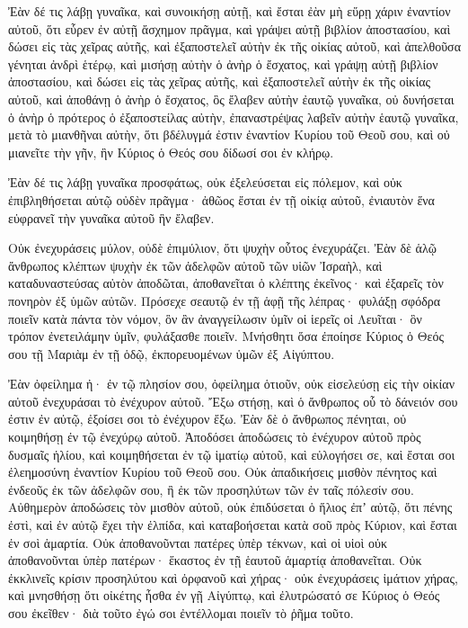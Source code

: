 {Ἐὰν δέ τις λάβῃ γυναῖκα, καὶ συνοικήσῃ αὐτῇ, καὶ ἔσται ἐὰν μὴ εὕρῃ χάριν ἐναντίον αὐτοῦ, ὅτι εὗρεν ἐν αὐτῇ ἄσχημον πρᾶγμα, καὶ γράψει αὐτῇ βιβλίον ἀποστασίου, καὶ δώσει εἰς τὰς χεῖρας αὐτῆς, καὶ ἐξαποστελεῖ αὐτὴν ἐκ τῆς οἰκίας αὐτοῦ,
καὶ ἀπελθοῦσα γένηται ἀνδρὶ ἑτέρῳ,
καὶ μισήσῃ αὐτὴν ὁ ἀνὴρ ὁ ἔσχατος, καὶ γράψῃ αὐτῇ βιβλίον ἀποστασίου, καὶ δώσει εἰς τὰς χεῖρας αὐτῆς, καὶ ἐξαποστελεῖ αὐτὴν ἐκ τῆς οἰκίας αὐτοῦ, καὶ ἀποθάνῃ ὁ ἀνὴρ ὁ ἔσχατος, ὃς ἔλαβεν αὐτὴν ἐαυτῷ γυναῖκα,
οὐ δυνήσεται ὁ ἀνὴρ ὁ πρότερος ὁ ἐξαποστείλας αὐτὴν, ἐπαναστρέψας λαβεῖν αὐτὴν ἑαυτῷ γυναῖκα, μετὰ τὸ μιανθῆναι αὐτὴν, ὅτι βδέλυγμά ἐστιν ἐναντίον Κυρίου τοῦ Θεοῦ σου, καὶ οὐ μιανεῖτε τὴν γῆν, ἣν Κύριος ὁ Θεός σου δίδωσί σοι ἐν κλήρῳ.
\par }{\PP {}Ἐὰν δέ τις λάβῃ γυναῖκα προσφάτως, οὐκ ἐξελεύσεται εἰς πόλεμον, καὶ οὐκ ἐπιβληθήσεται αὐτῷ οὐδὲν πρᾶγμα· ἀθῶος ἔσται ἐν τῇ οἰκίᾳ αὐτοῦ, ἐνιαυτὸν ἕνα εὐφρανεῖ τὴν γυναῖκα αὐτοῦ ἣν ἔλαβεν.
\par }{\PP {}Οὐκ ἐνεχυράσεις μύλον, οὐδὲ ἐπιμύλιον, ὅτι ψυχὴν οὗτος ἐνεχυράζει.
Ἐὰν δὲ ἁλῷ ἄνθρωπος κλέπτων ψυχὴν ἐκ τῶν ἀδελφῶν αὐτοῦ τῶν υἱῶν Ἰσραὴλ, καὶ καταδυναστεύσας αὐτὸν ἀποδῶται, ἀποθανεῖται ὁ κλέπτης ἐκεῖνος· καὶ ἐξαρεῖς τὸν πονηρὸν ἐξ ὑμῶν αὐτῶν.
Πρόσεχε σεαυτῷ ἐν τῇ ἁφῇ τῆς λέπρας· φυλάξῃ σφόδρα ποιεῖν κατὰ πάντα τὸν νόμον, ὃν ἂν ἀναγγείλωσιν ὑμῖν οἱ ἱερεῖς οἱ Λευῖται· ὃν τρόπον ἐνετειλάμην ὑμῖν, φυλάξασθε ποιεῖν.
Μνήσθητι ὅσα ἐποίησε Κύριος ὁ Θεός σου τῇ Μαριὰμ ἐν τῇ ὁδῷ, ἐκπορευομένων ὑμῶν ἐξ Αἰγύπτου.
\par }{\PP {}Ἐὰν ὀφείλημα ἠ· ἐν τῷ πλησίον σου, ὀφείλημα ὁτιοῦν, οὐκ εἰσελεύσῃ εἰς τὴν οἰκίαν αὐτοῦ ἐνεχυράσαι τὸ ἐνέχυρον αὐτοῦ.
Ἔξω στήσῃ, καὶ ὁ ἄνθρωπος οὗ τὸ δάνειόν σου ἐστιν ἐν αὐτῷ, ἐξοίσει σοι τὸ ἐνέχυρον ἔξω.
Ἐὰν δὲ ὁ ἄνθρωπος πένηται, οὐ κοιμηθήσῃ ἐν τῷ ἐνεχύρῳ αὐτοῦ.
Ἀποδόσει ἀποδώσεις τὸ ἐνέχυρον αὐτοῦ πρὸς δυσμαῖς ἡλίου, καὶ κοιμηθήσεται ἐν τῷ ἱματίῳ αὐτοῦ, καὶ εὐλογήσει σε, καὶ ἔσται σοι ἐλεημοσύνη ἐναντίον Κυρίου τοῦ Θεοῦ σου.
Οὐκ ἀπαδικήσεις μισθὸν πένητος καὶ ἐνδεοῦς ἐκ τῶν ἀδελφῶν σου, ἢ ἐκ τῶν προσηλύτων τῶν ἐν ταῖς πόλεσίν σου.
Αὐθημερὸν ἀποδώσεις τὸν μισθὸν αὐτοῦ, οὐκ ἐπιδύσεται ὁ ἥλιος ἐπʼ αὐτῷ, ὅτι πένης ἐστὶ, καὶ ἐν αὐτῷ ἔχει τὴν ἐλπίδα, καὶ καταβοήσεται κατὰ σοῦ πρὸς Κύριον, καὶ ἔσται ἐν σοὶ ἁμαρτία.
Οὐκ ἀποθανοῦνται πατέρες ὑπὲρ τέκνων, καὶ οἱ υἱοὶ οὐκ ἀποθανοῦνται ὑπὲρ πατέρων· ἕκαστος ἐν τῇ ἑαυτοῦ ἁμαρτίᾳ ἀποθανεῖται.
Οὐκ ἐκκλινεῖς κρίσιν προσηλύτου καὶ ὀρφανοῦ καὶ χήρας·
οὐκ ἐνεχυράσεις ἱμάτιον χήρας, καὶ μνησθήσῃ ὅτι οἰκέτης ἦσθα ἐν γῇ Αἰγύπτῳ, καὶ ἐλυτρώσατό σε Κύριος ὁ Θεός σου ἐκεῖθεν· διὰ τοῦτο ἐγώ σοι ἐντέλλομαι ποιεῖν τὸ ῥῆμα τοῦτο.
}
